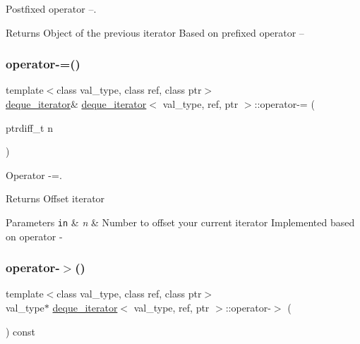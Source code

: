 Postfixed operator --. 

\begin{DoxyReturn}{Returns}
Object of the previous iterator Based on prefixed operator -- 
\end{DoxyReturn}
\hypertarget{structdeque__iterator_a1f10cb3090b780023a1454594cae75ca}{}\label{structdeque__iterator_a1f10cb3090b780023a1454594cae75ca} 
\subsubsection{\texorpdfstring{operator-\/=()}{operator-=()}}
{\footnotesize\ttfamily template$<$class val\+\_\+type, class ref, class ptr$>$ \\
\hyperlink{structdeque__iterator}{deque\+\_\+iterator}\& \hyperlink{structdeque__iterator}{deque\+\_\+iterator}$<$ val\+\_\+type, ref, ptr $>$\+::operator-\/= (\begin{DoxyParamCaption}\item[{ptrdiff\+\_\+t}]{n }\end{DoxyParamCaption})\hspace{0.3cm}{\ttfamily [inline]}}



Operator -\/=. 

\begin{DoxyReturn}{Returns}
Offset iterator 
\end{DoxyReturn}

\begin{DoxyParams}[1]{Parameters}
\mbox{\tt in}  & {\em n} & Number to offset your current iterator Implemented based on operator -\/ \\
\hline
\end{DoxyParams}
\hypertarget{structdeque__iterator_a454c668b6534c8139be843165a5d1c9e}{}\label{structdeque__iterator_a454c668b6534c8139be843165a5d1c9e} 
\subsubsection{\texorpdfstring{operator-\/$>$()}{operator->()}}
{\footnotesize\ttfamily template$<$class val\+\_\+type, class ref, class ptr$>$ \\
val\+\_\+type$\ast$ \hyperlink{structdeque__iterator}{deque\+\_\+iterator}$<$ val\+\_\+type, ref, ptr $>$\+::operator-\/$>$ (\begin{DoxyParamCaption}{ }\end{DoxyParamCaption}) const\hspace{0.3cm}{\ttfamily [inline]}}




